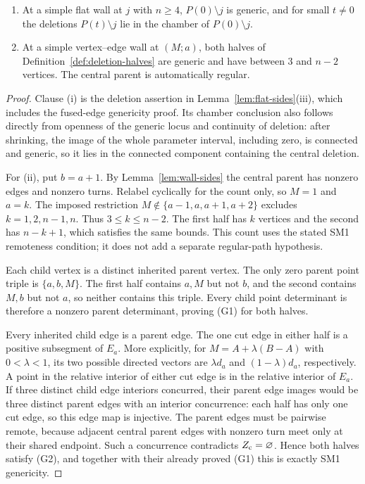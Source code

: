 \begin{lemma}\label{lem:children}\leanok
\begin{enumerate}
\item[(i)] At a simple flat wall at $j$ with $n\geq4$, $P(0)\setminus j$
is generic, and for small $t\ne0$ the deletions $P(t)\setminus j$ lie in
the chamber of $P(0)\setminus j$.
\item[(ii)] At a simple vertex--edge wall at $(M;a)$, both halves of
Definition~\ref{def:deletion-halves} are generic and have between $3$ and
$n-2$ vertices. The central parent is automatically regular.
\end{enumerate}

\end{lemma}
\begin{proof}\leanok{}
Clause (i) is the deletion assertion in
Lemma~\ref{lem:flat-sides}(iii), which includes the fused-edge
genericity proof. Its chamber conclusion also follows directly from openness
of the generic locus and continuity of deletion: after shrinking, the image
of the whole parameter interval, including zero, is connected and generic,
so it lies in the connected component containing the central deletion.

For (ii), put $b=a+1$. By Lemma~\ref{lem:wall-sides} the central parent
has nonzero edges and nonzero turns. Relabel cyclically for the count only,
so $M=1$ and $a=k$. The imposed restriction
$M\notin\{a-1,a,a+1,a+2\}$ excludes $k=1,2,n-1,n$. Thus
$3\leq k\leq n-2$. The first half has $k$ vertices and the second has
$n-k+1$, which satisfies the same bounds. This count uses the stated SM1
remoteness condition; it does not add a separate regular-path hypothesis.

Each child vertex is a distinct inherited parent vertex. The only zero
parent point triple is $\{a,b,M\}$. The first half contains $a,M$ but not
$b$, and the second contains $M,b$ but not $a$, so neither contains this
triple. Every child point determinant is therefore a nonzero parent
determinant, proving (G1) for both halves.

Every inherited child edge is a parent edge. The one cut edge in either
half is a positive subsegment of $E_a$. More explicitly, for
$M=A+\lambda(B-A)$ with $0<\lambda<1$, its two possible directed vectors
are $\lambda d_a$ and $(1-\lambda)d_a$, respectively. A point in the
relative interior of either cut edge is in the relative interior of $E_a$.
If three distinct child edge interiors concurred, their parent edge images
would be three distinct parent edges with an interior concurrence: each
half has only one cut edge, so this edge map is injective. The parent edges
must be pairwise remote, because adjacent central parent edges with nonzero
turn meet only at their shared endpoint. Such a concurrence contradicts
$Z_{\rm c}=\varnothing$. Hence both halves satisfy (G2), and together with
their already proved (G1) this is exactly SM1 genericity.
\end{proof}


